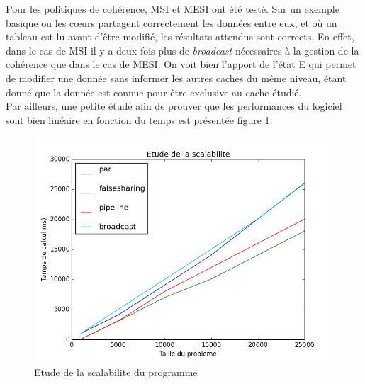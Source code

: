 Pour les politiques de cohérence, MSI et MESI ont été testé. Sur un exemple basique ou les c{\oe}urs partagent correctement les données entre eux, et où un tableau est lu avant d'être modifié, les résultats attendus sont corrects. En effet, dans le cas de MSI il y a deux fois plus de \emph{broadcast} nécessaires à la gestion de la cohérence que dans le cas de MESI. On voit bien l'apport de l'état E qui permet de modifier une donnée sans informer les autres caches du même niveau, étant donné que la donnée est connue pour être exclusive au cache étudié. \\

Par ailleurs, une petite étude afin de prouver que les performances du logiciel sont bien linéaire en fonction du temps est présentée figure \ref{img:inclusifs}. \\

\begin{figure}[H]
\begin{center}
   \includegraphics[scale=0.35]{images/scalability.png}
   \caption{\label{img:inclusifs} Etude de la scalabilite du programme}
\end{center}
\end{figure}
